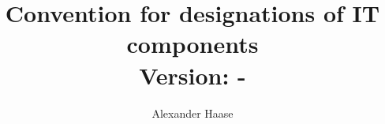 \documentclass[a4paper,11pt]{article}
\title{
	Convention for designations of IT components \\
	\small Version: \gitVtag-\gitAbbrevHash
}
\author{Alexander Haase}
\date{\gitAuthorDate}
\begin{document}
	\maketitle


	

	
	
	
	


	\nocite{*}
	{}
	
\end{document}
